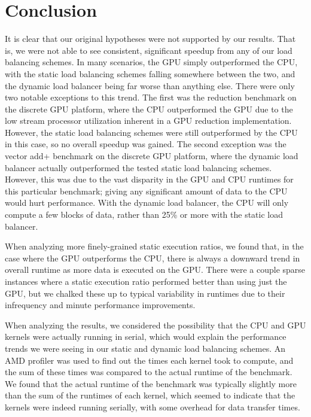\documentclass[journal]{IEEEtran}
\begin{document}
\section{Conclusion}
It is clear that our original hypotheses were not supported by our results.  That
is, we were not able to see consistent, significant speedup from any of our load
balancing schemes.  In many scenarios, the GPU simply outperformed the CPU, with
the static load balancing schemes falling somewhere between the two, and the dynamic
load balancer being far worse than anything else.  There were only two notable
exceptions to this trend.  The first was the reduction benchmark on the discrete GPU
platform, where the CPU outperformed the GPU due to the low stream processor utilization
inherent in a GPU reduction implementation.  However, the static load balancing schemes
were still outperformed by the CPU in this case, so no overall speedup was gained. The
second exception was the vector add+ benchmark on the discrete GPU platform, where the
dynamic load balancer actually outperformed the tested static load balancing schemes.
However, this was due to the vast disparity in the GPU and CPU runtimes for this
particular benchmark; giving any significant amount of data to the CPU would hurt
performance.  With the dynamic load balancer, the CPU will only compute a few blocks
of data, rather than 25\% or more with the static load balancer.

When analyzing more finely-grained static execution ratios, we found that, in the case
where the GPU outperforms the CPU, there is always a downward trend in overall runtime
as more data is executed on the GPU.  There were a couple sparse instances where a static
execution ratio performed better than using just the GPU, but we chalked these up to
typical variability in runtimes due to their infrequency and minute performance improvements.

When analyzing the results, we considered the possibility that the CPU and GPU kernels were
actually running in serial, which would explain the performance trends we were seeing in our
static and dynamic load balancing schemes.  An AMD profiler was used to find out the times each
kernel took to compute, and the sum of these times was compared to the actual runtime of the
benchmark.  We found that the actual runtime of the benchmark was typically slightly more than
the sum of the runtimes of each kernel, which seemed to indicate that the kernels were indeed
running serially, with some overhead for data transfer times.
\end{document}
